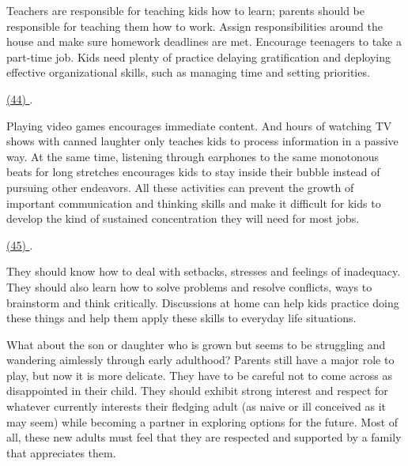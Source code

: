 \qquad Teachers are responsible for teaching kids how to learn; parents should be responsible for teaching them how to work. Assign responsibilities around the house and make sure homework deadlines are met. Encourage teenagers to take a part-time job. Kids need plenty of practice delaying gratification and deploying effective organizational skills, such as managing time and setting priorities.

\qquad \ul{(44) \qquad\qquad}.

\qquad Playing video games encourages immediate content. And hours of watching TV shows with canned laughter only teaches kids to process information in a passive way. At the same time, listening through earphones to the same monotonous beats for long stretches encourages kids to stay inside their bubble instead of pursuing other endeavors. All these activities can prevent the growth of important communication and thinking skills and make it difficult for kids to develop the kind of sustained concentration they will need for most jobs.

\qquad \ul{(45) \qquad\qquad}.

\qquad They should know how to deal with setbacks, stresses and feelings of inadequacy. They should also learn how to solve problems and resolve conflicts, ways to brainstorm and think critically. Discussions at home can help kids practice doing these things and help them apply these skills to everyday life situations.

\qquad What about the son or daughter who is grown but seems to be struggling and wandering aimlessly through early adulthood? Parents still have a major role to play, but now it is more delicate. They have to be careful not to come across as disappointed in their child. They should exhibit strong interest and respect for whatever currently interests their fledging adult (as naive or ill conceived as it may seem) while becoming a partner in exploring options for the future. Most of all, these new adults must feel that they are respected and supported by a family that appreciates them.
